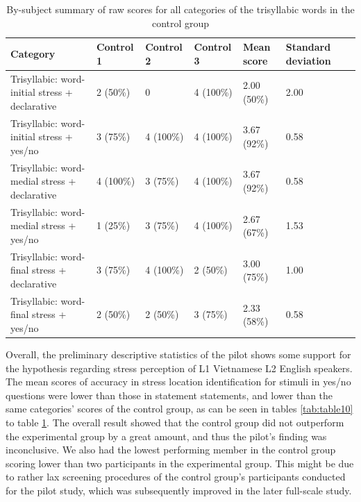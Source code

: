 \documentclass[a4paper]{article}
\begin{document}
\begin{table}[H]
  \begin{center}
    \caption{By-subject summary of raw scores for all categories of the trisyllabic words in the control group}
    \label{tab:table13}
      \begin{tabular}{|p{2cm}|p{2cm}|p{2cm}|p{2cm}|p{2cm}|p{2cm}|p{2cm}}
            \hline
         Category  & Control 1 & Control 2 & Control 3 & Mean score & Standard deviation  \\
         \hline
     Trisyllabic: word-initial stress + declarative & 2 (50\%)  & 0 &   4 (100\%) & 2.00 (50\%) & 2.00 \\
      \hline
     Trisyllabic: word-initial stress + yes/no & 3 (75\%) &  4 (100\%) & 4 (100\%) & 3.67 (92\%) & 0.58 \\
           \hline
     Trisyllabic: word-medial stress + declarative & 4 (100\%) & 3 (75\%) &4 (100\%) & 3.67 (92\%) & 0.58 \\
      \hline
     Trisyllabic: word-medial stress + yes/no & 1 (25\%) &  3 (75\%) &4 (100\%) & 2.67 (67\%) & 1.53\\
           \hline
     Trisyllabic: word-final stress + declarative & 3 (75\%) &4 (100\%) & 2 (50\%) & 3.00 (75\%) & 1.00 \\
      \hline
     Trisyllabic: word-final stress + yes/no & 2 (50\%)  & 2 (50\%) &  3 (75\%) & 2.33 (58\%) & 0.58   \\
     
     \hline
    \end{tabular}
  \end{center}
\end{table}

Overall, the preliminary descriptive statistics of the pilot shows some support for the hypothesis regarding stress perception of L1 Vietnamese L2 English speakers. The mean scores of accuracy in stress location identification for stimuli in yes/no questions were lower than those in statement statements, and lower than the same categories' scores of the control group, as can be seen in tables \ref{tab:table10} to table \ref{tab:table13}. The overall result showed that the control group did not outperform the experimental group by a great amount, and thus the pilot's finding was inconclusive. We also had the lowest performing member in the control group scoring lower than two participants in the experimental group. This might be due to rather lax screening procedures of the control group's participants conducted for the pilot study, which was subsequently improved in the later full-scale study.
\end{document}
